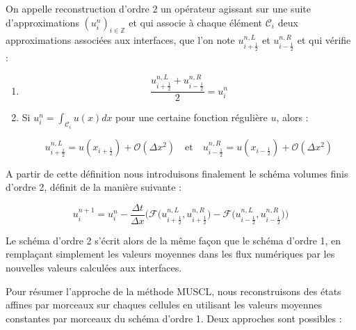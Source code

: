 \begin{definitionbox}
\begin{definition}
    On appelle reconstruction d'ordre 2 un opérateur agissant sur une suite d'approximations $(u_i^n)_{i\in \mathbb{Z}}$ et qui associe à chaque 
    élément $\mathcal{C}_i$ deux approximations associées aux interfaces, que l'on note $u_{i+\frac{1}{2}}^{n,L}$ et $u_{i-\frac{1}{2}}^{n,R}$ et qui vérifie :

    \begin{enumerate}
        \item $$\frac{u_{i+\frac{1}{2}}^{n,L} + u_{i-\frac{1}{2}}^{n,R}}{2} = u_i^n$$
        \item Si $\displaystyle u_i^n = \int_{\mathcal{C}_i} u(x) dx$ pour une certaine fonction régulière $u$, alors :
        
        $$u_{i+\frac{1}{2}}^{n,L} = u(x_{i+\frac{1}{2}}) + \mathcal{O}(\Delta x^2) \quad \text{et} \quad u_{i-\frac{1}{2}}^{n,R} = u(x_{i-\frac{1}{2}}) + \mathcal{O}(\Delta x^2)$$
    \end{enumerate}
\end{definition}
\end{definitionbox}

\vspace{1em}

A partir de cette définition nous introduisons finalement le schéma volumes finis d'ordre 2, définit de la manière suivante :

$$u_i^{n+1} = u_i^n - \frac{\Delta t}{\Delta x} \bigg( \mathcal{F}\Big(u_{i+\frac{1}{2}}^{n,L}, u_{i+\frac{1}{2}}^{n,R} \Big) - \mathcal{F}\Big(u_{i-\frac{1}{2}}^{n,L}, u_{i-\frac{1}{2}}^{n,R} \Big) \bigg)$$

Le schéma d'ordre 2 s'écrit alors de la même façon que le schéma d'ordre 1, en remplaçant simplement les valeurs moyennes dans les flux numériques par les nouvelles valeurs calculées aux interfaces.

Pour résumer l'approche de la méthode MUSCL, nous reconstruisons des états affines par morceaux sur chaques cellules en utilisant les valeurs moyennes constantes par morceaux du schéma d'ordre 1. Deux approches sont possibles : 

